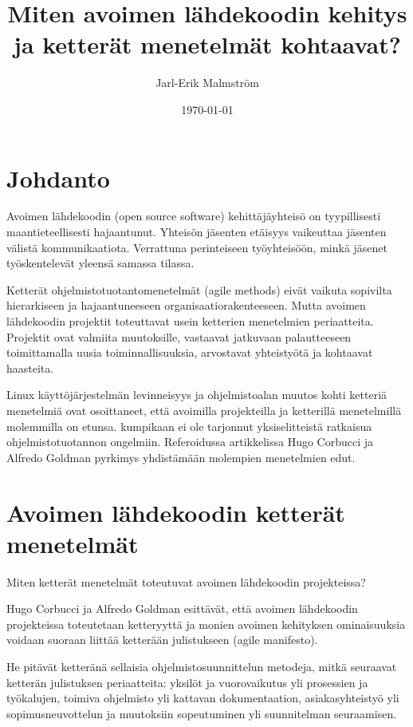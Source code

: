 \documentclass[finnish]{tktltiki2}
\title{Miten avoimen lähdekoodin kehitys ja ketterät menetelmät kohtaavat?}
\author{Jarl-Erik Malmström}
\date{\today}
\theoremstyle{definition}
\theoremstyle{remark}
\begin{document}

\maketitle        %
\makeabstract     %

\tableofcontents  %
\newpage          %



\section{Johdanto}

Avoimen lähdekoodin (open source software) kehittäjäyhteisö on tyypillisesti maantieteellisesti hajaantunut. Yhteisön jäsenten etäisyys vaikeuttaa jäsenten välistä kommunikaatiota. Verrattuna perinteiseen työyhteisöön, minkä jäsenet työskentelevät yleensä samassa tilassa.

Ketterät ohjelmistotuotantomenetelmät (agile methods) eivät vaikuta sopivilta hierarkiseen ja hajaantuneeseen organisaatiorakenteeseen. Mutta avoimen lähdekoodin projektit toteuttavat usein ketterien menetelmien periaatteita. Projektit ovat valmiita muutoksille, vastaavat jatkuvaan palautteeseen toimittamalla uusia toiminnallisuuksia, arvostavat yhteistyötä ja kohtaavat haasteita. 

Linux käyttöjärjestelmän levinneisyys ja ohjelmistoalan muutos kohti ketteriä menetelmiä ovat osoittaneet, että avoimilla projekteilla ja ketterillä menetelmillä molemmilla on etunsa. kumpikaan ei ole tarjonnut yksiselitteistä ratkaisua ohjelmistotuotannon ongelmiin. Referoidussa  artikkelissa\cite{COG08} Hugo Corbucci ja Alfredo Goldman pyrkimys yhdistämään molempien menetelmien edut.

\section{Avoimen lähdekoodin ketterät menetelmät}

Miten ketterät menetelmät toteutuvat avoimen lähdekoodin projekteissa?

Hugo Corbucci ja Alfredo Goldman esittävät, että avoimen lähdekoodin projekteissa toteutetaan ketteryyttä ja monien avoimen kehityksen ominaisuuksia voidaan suoraan liittää ketterään julistukseen (agile manifesto). 

He pitävät ketteränä sellaisia ohjelmistosuunnittelun metodeja, mitkä seuraavat ketterän julistuksen periaatteita: yksilöt ja vuorovaikutus yli prosessien ja työkalujen, toimiva ohjelmisto yli kattavan dokumentaation, asiakasyhteistyö yli sopimusneuvottelun ja muutoksiin sopeutuminen yli suunnitelman seuraamisen.
\end{document}
